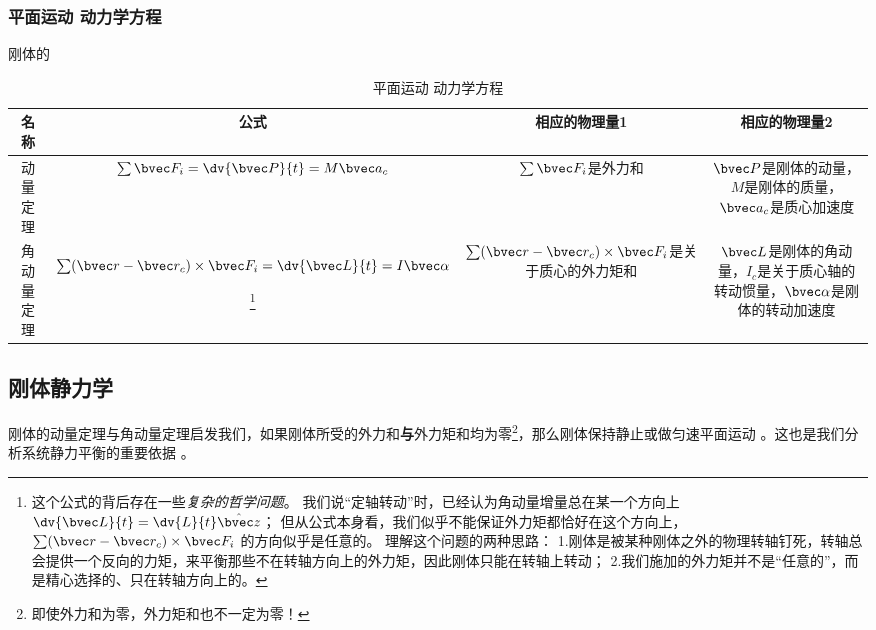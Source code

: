 \subsubsection{平面运动 动力学方程}
刚体的
\begin{table}[ht]
\centering
\caption{平面运动 动力学方程}\label{tab_RGAB_1}
\begin{tabular}{|c|c|c|c|}
\hline
名称 & 公式 & 相应的物理量1 & 相应的物理量2 \\
\hline
动量定理 & $\sum \bvec F_i = \dv{\bvec P}{t} = M \bvec a_c$ & $\sum \bvec F_i$是外力和 & $\bvec P$是刚体的动量，$M$是刚体的质量，$\bvec a_c$是质心加速度 \\
\hline
角动量定理 & $\sum (\bvec r - \bvec r_c) \times \bvec F_i = \dv{\bvec L}{t} = I \bvec \alpha$ 

\footnote{
这个公式的背后存在一些\textsl{复杂的哲学问题}。
我们说“定轴转动”时，已经认为角动量增量总在某一个方向上$\dv{\bvec L}{t} = \dv{L}{t} \hat{\bvec z}$；
但从公式本身看，我们似乎不能保证外力矩都恰好在这个方向上，$\sum (\bvec r - \bvec r_c) \times \bvec F_i$ 的方向似乎是任意的。
理解这个问题的两种思路：
1.刚体是被某种刚体之外的物理转轴钉死，转轴总会提供一个反向的力矩，来平衡那些不在转轴方向上的外力矩，因此刚体只能在转轴上转动；
2.我们施加的外力矩并不是“任意的”，而是精心选择的、只在转轴方向上的。
} 

& $\sum (\bvec r - \bvec r_c)\times \bvec F_i$是关于质心的外力矩和 & $\bvec L$是刚体的角动量，$I_c$是关于质心轴的转动惯量，$\bvec \alpha$是刚体的转动加速度 \\
\hline
\end{tabular}
\end{table}

\subsection{刚体静力学}
刚体的动量定理与角动量定理启发我们，如果刚体所受的外力和\textbf{与}外力矩和均为零\footnote{即使外力和为零，外力矩和也不一定为零！}，那么刚体保持静止或做匀速平面运动 。这也是我们分析系统静力平衡的重要依据 。


